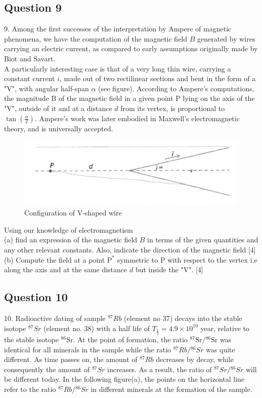\documentclass{article}
\begin{document}
\subsection{Question 9}
9. Among the first successes of the interpretation by Ampere of magnetic phenomena, we have the computation of the magnetic field $B$ generated by wires carrying an electric current, as compared to early assumptions originally made by Biot and Savart. \\
A particularly interesting case is that of a very long thin wire, carrying a constant current $i$, made out of two rectilinear sections and bent in the form of a "V", with angular half-span $\alpha$ (see figure). According to Ampere's computations, the magnitude $\mathrm{B}$ of the magnetic field in a given point $\mathrm{P}$ lying on the axis of the "V", outside of it and at a distance $d$ from its vertex, is proportional to $\tan \left(\frac{\alpha}{2}\right) .$ Ampere's work was later embodied in Maxwell's electromagnetic theory, and is universally accepted. 

\begin{figure}
	\centering
	\includegraphics[width=0.5\linewidth]{spho_book_TYS_images/2014q9.png}
	\caption{Configuration of V-shaped wire}
\end{figure}

Using our knowledge of electromagnetism \\
(a) find an expression of the magnetic field $B$ in terms of the given quantities and any other relevant constants. Also, indicate the direction of the magnetic field [4] \\
(b) Compute the field at a point $\mathrm{P}^{*}$ symmetric to $\mathrm{P}$ with respect to the vertex i.e along the axis and at the same distance $d$ but inside the "V". [4] \\

\subsection{Question 10}
10. Radioactive dating of sample ${ }^{87} R b$ (element no 37) decays into the stable isotope ${ }^{87} S r$ (element no. 38) with a half life of $T_{\frac{1}{2}}=4.9 \times 10^{10}$ year, relative to the stable isotope ${ }^{86} \mathrm{Sr} .$ At the point of formation, the ratio ${ }^{87} \mathrm{Sr} /{ }^{86} \mathrm{Sr}$ was identical for all minerals in the sample while the ratio ${ }^{87} R b /{ }^{86} S r$ was quite different. As time passes on, the amount of ${ }^{87} R b$ decreases by decay, while consequently the amount of ${ }^{87} S r$ increases. As a result, the ratio of ${ }^{87} S r /{ }^{86} S r$ will be different today. In the following figure(a), the points on the horizontal line refer to the ratio ${ }^{87} R b /{ }^{86} S r$ in different minerals at the formation of the sample.
\end{document}
